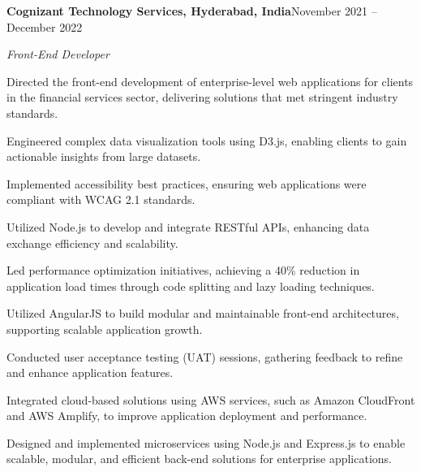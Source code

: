 \documentclass[11pt,a4paper]{article}
\newenvironment{resume_list}{%
  \begin{itemize}[leftmargin=1.5em, topsep=2pt, itemsep=0pt, parsep=0pt]
}{%
  \end{itemize}
}
\newcommand{\headingBf}[2]{%
  \textbf{#1}\hfill #2\par
}
\newcommand{\headingIt}[2]{%
  \textit{#1}\hfill #2\par
}
\begin{document}
\headingBf{Cognizant Technology Services, Hyderabad, India}{November 2021 -- December 2022}
\headingIt{Front-End Developer}{}
\begin{resume_list}
    \item Directed the front-end development of enterprise-level web applications for clients in the financial services sector, delivering solutions that met stringent industry standards.
    \item Engineered complex data visualization tools using D3.js, enabling clients to gain actionable insights from large datasets.
    \item Implemented accessibility best practices, ensuring web applications were compliant with WCAG 2.1 standards.
    \item Utilized Node.js to develop and integrate RESTful APIs, enhancing data exchange efficiency and scalability.
    \item Led performance optimization initiatives, achieving a 40\% reduction in application load times through code splitting and lazy loading techniques.
    \item Utilized AngularJS to build modular and maintainable front-end architectures, supporting scalable application growth.
    \item Conducted user acceptance testing (UAT) sessions, gathering feedback to refine and enhance application features.
    \item Integrated cloud-based solutions using AWS services, such as Amazon CloudFront and AWS Amplify, to improve application deployment and performance.
    \item Designed and implemented microservices using Node.js and Express.js to enable scalable, modular, and efficient back-end solutions for enterprise applications.
\end{resume_list}
\end{document}
